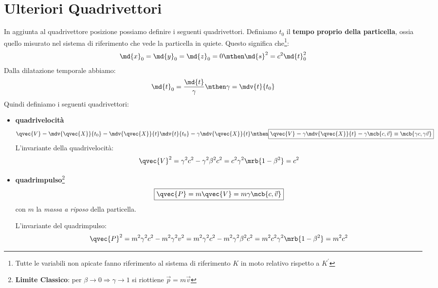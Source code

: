\section{Ulteriori Quadrivettori}
In aggiunta al quadrivettore posizione possiamo definire i seguenti
quadrivettori. Definiamo $t_0$ il \textbf{tempo proprio della particella},
ossia quello misurato nel sistema di riferimento che vede la particella in 
quiete. Questo significa che\footnote{
  Tutte le variabili non apicate fanno riferimento al sistema di riferimento
  $K$ in moto relativo rispetto a $K^\prime$
}:
\begin{equation}
  \md{x}_0 = \md{y}_0 = \md{z}_0 = 0 
  \mthen
  \md{s}^2 = c^2 \md{t}_0^2
\end{equation}
Dalla dilatazione temporale abbiamo:
\begin{equation}
  \md{t}_0 = \frac{\md{t}}{\gamma}
  \mthen
  \gamma = \mdv{t}{t_0}
\end{equation}
Quindi definiamo i seguenti quadrivettori:
\begin{itemize}
  \item \textbf{quadrivelocità}
    \begin{equation}
      \qvec{V} = \mdv{\qvec{X}}{t_0} = \mdv{\qvec{X}}{t} \mdv{t}{t_0} =
      \gamma \mdv{\qvec{X}}{t}
      \mthen
      \boxed{
        \qvec{V}
        = \gamma\mdv{\qvec{X}}{t}
        = \gamma \mcb{c,\vec{v}}
        \equiv \mcb{\gamma c, \gamma \vec{v}}
      }
    \end{equation}
    L'invariante della quadrivelocità:
    \begin{equation}
      \qvec{V}^2 = \gamma^2c^2 - \gamma^2\beta^2c^2 =
      c^2\gamma^2\mrb{1-\beta^2} = c^2
    \end{equation}

  \item \textbf{quadrimpulso}\footnote{
      \textbf{Limite Classico}: per $\beta\to 0 \Rightarrow \gamma\to 1$ si
      riottiene $\vec{p} = m\vec{v}$
    }
    \begin{equation}
      \boxed{\qvec{P} = m \qvec{V} = m \gamma \mcb{c,\vec{v}}}
    \end{equation}
    con $m$ la \textit{massa a riposo} della particella.\par
    L'invariante del quadrimpulso:
    \begin{equation}
      \qvec{P}^2 = m^2\gamma^2c^2 - m^2\gamma^2v^2 = m^2\gamma^2c^2 -
      m^2\gamma^2\beta^2c^2 = m^2c^2\gamma^2\mrb{1-\beta^2} = m^2c^2
    \end{equation}
\end{itemize}

